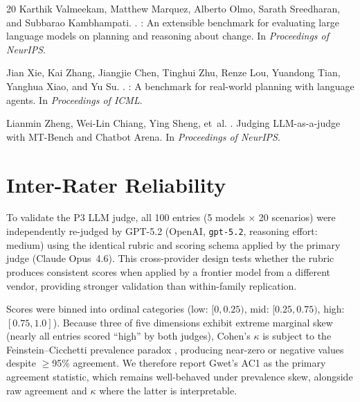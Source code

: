 \documentclass[11pt,a4paper]{article}
\begin{document}
\begin{thebibliography}{20}
Karthik Valmeekam, Matthew Marquez, Alberto Olmo, Sarath Sreedharan, and Subbarao Kambhampati.
.
: An extensible benchmark for evaluating large language models on planning and reasoning about change.
\newblock In \emph{Proceedings of NeurIPS}.

Jian Xie, Kai Zhang, Jiangjie Chen, Tinghui Zhu, Renze Lou, Yuandong Tian, Yanghua Xiao, and Yu Su.
.
: A benchmark for real-world planning with language agents.
\newblock In \emph{Proceedings of ICML}.

Lianmin Zheng, Wei-Lin Chiang, Ying Sheng, et~al.
.
\newblock Judging {LLM}-as-a-judge with {MT-Bench} and {Chatbot Arena}.
\newblock In \emph{Proceedings of NeurIPS}.

\end{thebibliography}

\appendix
\section{Inter-Rater Reliability}
\label{app:irr}

To validate the P3 LLM judge, all 100 entries (5 models $\times$ 20 scenarios) were independently re-judged by GPT-5.2 (OpenAI, \texttt{gpt-5.2}, reasoning effort: medium) using the identical rubric and scoring schema applied by the primary judge (Claude Opus~4.6). This cross-provider design tests whether the rubric produces consistent scores when applied by a frontier model from a different vendor, providing stronger validation than within-family replication.

Scores were binned into ordinal categories (low: $[0, 0.25)$, mid: $[0.25, 0.75)$, high: $[0.75, 1.0]$). Because three of five dimensions exhibit extreme marginal skew (nearly all entries scored ``high'' by both judges), Cohen's $\kappa$ is subject to the Feinstein--Cicchetti prevalence paradox \citep{byrt1993bias}, producing near-zero or negative values despite $\geq$95\% agreement. We therefore report Gwet's AC1 \citep{gwet2008computing} as the primary agreement statistic, which remains well-behaved under prevalence skew, alongside raw agreement and $\kappa$ where the latter is interpretable.
\end{document}
